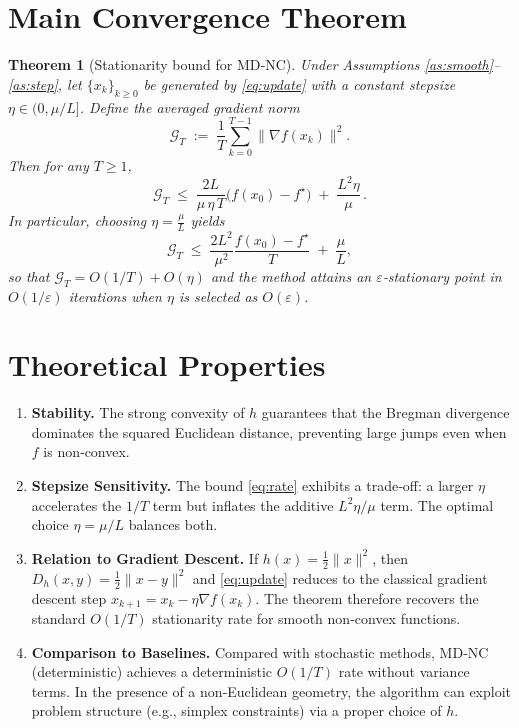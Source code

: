 \documentclass{article}
\newtheorem{theorem}{Theorem}
\newcommand{\grad}{\nabla}
\newcommand{\Breg}{D_h}
\begin{document}
\section*{Main Convergence Theorem}
\begin{theorem}[Stationarity bound for MD‑NC]\label{thm:main}
Under Assumptions \ref{as:smooth}–\ref{as:step}, let $\{x_k\}_{k\ge0}$ be generated by
\eqref{eq:update} with a constant stepsize $\eta\in(0,\mu/L]$.
Define the averaged gradient norm
\[
\mathcal{G}_T\;:=\;\frac{1}{T}\sum_{k=0}^{T-1}\|\grad f(x_k)\|^{2}.
\]
Then for any $T\ge 1$,
\begin{equation}\label{eq:rate}
\mathcal{G}_T
\;\le\;
\frac{2L}{\mu\,\eta\,T}\bigl(f(x_0)-f^\star\bigr)
\;+\;
\frac{L^{2}\eta}{\mu}\, .
\end{equation}
In particular, choosing $\eta=\frac{\mu}{L}$ yields
\[
\mathcal{G}_T\;\le\;\frac{2L^{2}}{\mu^{2}}\frac{f(x_0)-f^\star}{T}
\;+\;
\frac{\mu}{L},
\]
so that $\mathcal{G}_T=O(1/T)+O(\eta)$ and the method attains an
$\varepsilon$‑stationary point in $O(1/\varepsilon)$ iterations when
$\eta$ is selected as $O(\varepsilon)$.
\end{theorem}

\section*{Theoretical Properties}
\begin{enumerate}
\item \textbf{Stability.} The strong convexity of $h$ guarantees that the Bregman
divergence dominates the squared Euclidean distance, preventing large jumps
even when $f$ is non‑convex.
\item \textbf{Stepsize Sensitivity.} The bound \eqref{eq:rate} exhibits a trade‑off:
a larger $\eta$ accelerates the $1/T$ term but inflates the additive
$L^{2}\eta/\mu$ term. The optimal choice $\eta=\mu/L$ balances both.
\item \textbf{Relation to Gradient Descent.}
If $h(x)=\tfrac12\|x\|^{2}$, then $\Breg(x,y)=\tfrac12\|x-y\|^{2}$ and
\eqref{eq:update} reduces to the classical gradient descent step
$x_{k+1}=x_k-\eta\grad f(x_k)$. The theorem therefore recovers the
standard $O(1/T)$ stationarity rate for smooth non‑convex functions.
\item \textbf{Comparison to Baselines.}
Compared with stochastic methods, MD‑NC (deterministic) achieves a deterministic
$O(1/T)$ rate without variance terms. In the presence of a non‑Euclidean geometry,
the algorithm can exploit problem structure (e.g., simplex constraints) via a
proper choice of $h$.
\end{enumerate}
\end{document}
